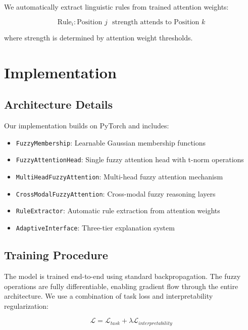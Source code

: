 \documentclass[manuscript,review,anonymous]{acmart}
\begin{document}
We automatically extract linguistic rules from trained attention weights:

\begin{equation}
\text{Rule}_i: \text{Position } j \text{ } \text{strength} \text{ attends to Position } k
\end{equation}

where strength is determined by attention weight thresholds.

\section{Implementation}

\subsection{Architecture Details}

Our implementation builds on PyTorch and includes:

\begin{itemize}
    \item \texttt{FuzzyMembership}: Learnable Gaussian membership functions
    \item \texttt{FuzzyAttentionHead}: Single fuzzy attention head with t-norm operations
    \item \texttt{MultiHeadFuzzyAttention}: Multi-head fuzzy attention mechanism
    \item \texttt{CrossModalFuzzyAttention}: Cross-modal fuzzy reasoning layers
    \item \texttt{RuleExtractor}: Automatic rule extraction from attention weights
    \item \texttt{AdaptiveInterface}: Three-tier explanation system
\end{itemize}

\subsection{Training Procedure}

The model is trained end-to-end using standard backpropagation. The fuzzy operations are fully differentiable, enabling gradient flow through the entire architecture. We use a combination of task loss and interpretability regularization:

\begin{equation}
\mathcal{L} = \mathcal{L}_{task} + \lambda \mathcal{L}_{interpretability}
\end{equation}
\end{document}
